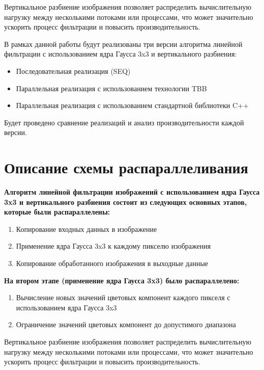 \documentclass{report}
\begin{document}
\par Вертикальное разбиение изображения позволяет распределить вычислительную нагрузку между несколькими потоками или процессами, что может значительно ускорить процесс фильтрации и повысить производительность.

\par В рамках данной работы будут реализованы три версии алгоритма линейной фильтрации с использованием ядра Гаусса 3x3 и вертикального разбиения:
\begin{itemize}
\item Последовательная реализация (SEQ)
\item Параллельная реализация с использованием технологии TBB
\item Параллельная реализация с использованием стандартной библиотеки C++
\end{itemize}
Будет проведено сравнение реализаций и анализ производительности каждой версии.

\newpage

\section* {Описание схемы распараллеливания}
\par \textbf{Алгоритм линейной фильтрации изображений с использованием ядра Гаусса 3x3 и вертикального разбиения состоит из следующих основных этапов, которые были распараллелены:}
\begin{enumerate}
\item Копирование входных данных в изображение
\item Применение ядра Гаусса 3x3 к каждому пикселю изображения
\item Копирование обработанного изображения в выходные данные
\end{enumerate}
\vspace{2em}
\par \textbf{На втором этапе (применение ядра Гаусса 3x3) было распараллелено:}
\begin{enumerate}
\item Вычисление новых значений цветовых компонент каждого пикселя с использованием ядра Гаусса 3x3
\item Ограничение значений цветовых компонент до допустимого диапазона
\end{enumerate}
\vspace{1em}
\par Вертикальное разбиение изображения позволяет распределить вычислительную нагрузку между несколькими потоками или процессами, что может значительно ускорить процесс фильтрации и повысить производительность.
\end{document}
